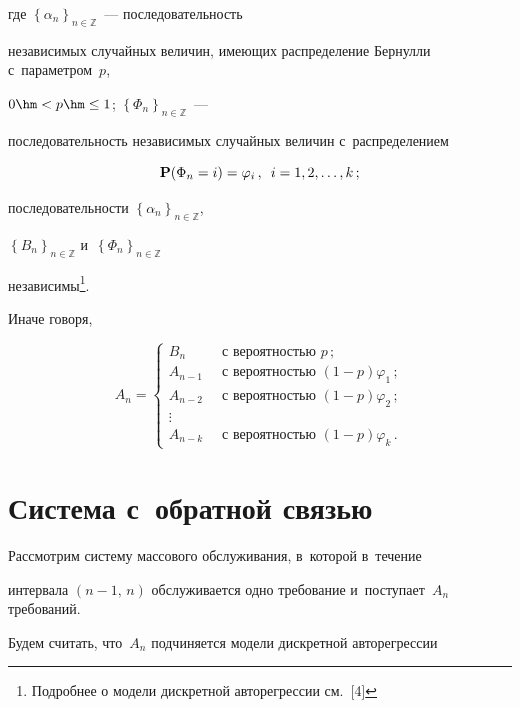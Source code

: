где $\left\{\alpha_n\right\}_{n\in\mathbb{Z}}$~--- последовательность

независимых случайных величин, имеющих распределение Бернулли с~параметром~$p$,

$0\hm<p\hm\leq1$; $\left\{\Phi_n\right\}_{n\in\mathbb{Z}}$~---

последовательность независимых случайных величин с~распределением

$$

\mathbf{P}(\Phi_n=i)=\varphi_i\,,\enskip i=1,2,\ldots,k\,;

$$

последовательности $\left\{\alpha_n\right\}_{n\in\mathbb{Z}}$,

$\left\{B_n\right\}_{n\in\mathbb{Z}}$ и~$\left\{\Phi_n\right\}_{n\in\mathbb{Z}}$

независимы\footnote{Подробнее о модели дискретной авторегрессии см.~[4]}.

Иначе говоря,

\begin{equation*}

A_n=\begin{cases}

B_n &\ \mbox{ с вероятностью } p\,;\\

A_{n-1}&\ \mbox{ с вероятностью } (1-p)\varphi_1\,;\\

A_{n-2}&\ \mbox{ с вероятностью } (1-p)\varphi_2\,;\\

\vdots&\\

A_{n-k}&\ \mbox{ с вероятностью } (1-p)\varphi_k\,.

\end{cases}

\end{equation*}



\section{Система {} с~обратной связью}



Рассмотрим систему массового обслуживания, в~которой в~течение

интервала $(n-1,\,n)$ обслуживается одно требование и~поступает~$A_n$ требований.

Будем считать, что~$A_n$ подчиняется модели дискретной авторегрессии

